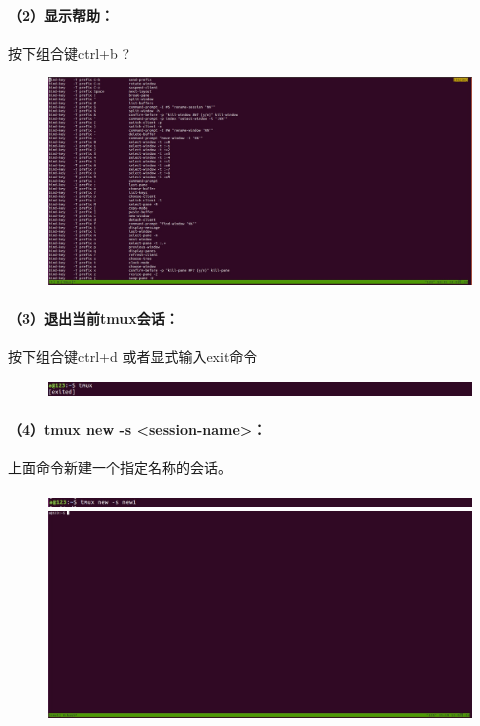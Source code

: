 \documentclass[a4paper, 12pt]{article}
\begin{document}
	\paragraph{（2）显示帮助：}	
	按下组合键ctrl+b ?
	
	\begin{figure}[H]
		\centering
		\includegraphics[width=1\textwidth]{012.jpg}
	\end{figure}
	
	\paragraph{（3）退出当前tmux会话：}
	按下组合键ctrl+d 或者显式输入exit命令
	
	\begin{figure}[H]
		\centering
		\includegraphics[width=1\textwidth]{013.jpg}
	\end{figure}
	
	\paragraph{（4）tmux new -s <session-name>：}
	上面命令新建一个指定名称的会话。	
	
	\begin{figure}[H]
		\centering
		\includegraphics[width=1\textwidth]{014.jpg}
		\includegraphics[width=1\textwidth]{015.jpg}
	\end{figure}
	
\end{document}
